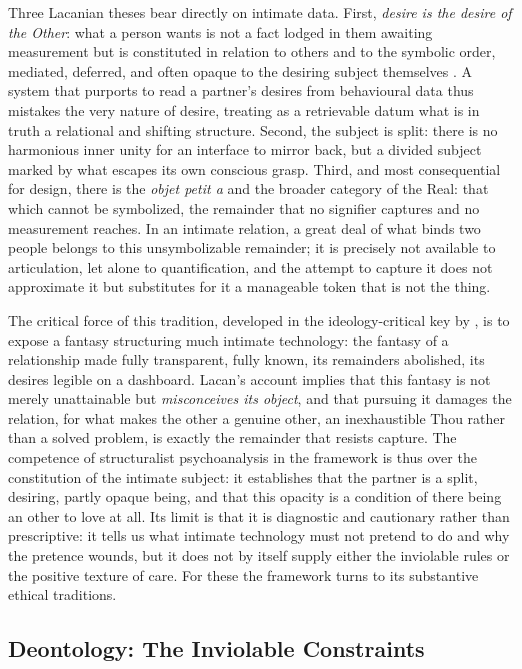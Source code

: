 Three Lacanian theses bear directly on intimate data. First, \emph{desire is the desire of the Other}: what a person wants is not a fact lodged in them awaiting measurement but is constituted in relation to others and to the symbolic order, mediated, deferred, and often opaque to the desiring subject themselves \parencite{lacan1977four}. A system that purports to read a partner's desires from behavioural data thus mistakes the very nature of desire, treating as a retrievable datum what is in truth a relational and shifting structure. Second, the subject is split: there is no harmonious inner unity for an interface to mirror back, but a divided subject marked by what escapes its own conscious grasp. Third, and most consequential for design, there is the \emph{objet petit a} and the broader category of the Real: that which cannot be symbolized, the remainder that no signifier captures and no measurement reaches. In an intimate relation, a great deal of what binds two people belongs to this unsymbolizable remainder; it is precisely not available to articulation, let alone to quantification, and the attempt to capture it does not approximate it but substitutes for it a manageable token that is not the thing.

The critical force of this tradition, developed in the ideology-critical key by \textcite{zizek1989sublime}, is to expose a fantasy structuring much intimate technology: the fantasy of a relationship made fully transparent, fully known, its remainders abolished, its desires legible on a dashboard. Lacan's account implies that this fantasy is not merely unattainable but \emph{misconceives its object}, and that pursuing it damages the relation, for what makes the other a genuine other, an inexhaustible Thou rather than a solved problem, is exactly the remainder that resists capture. The competence of structuralist psychoanalysis in the framework is thus over the constitution of the intimate subject: it establishes that the partner is a split, desiring, partly opaque being, and that this opacity is a condition of there being an other to love at all. Its limit is that it is diagnostic and cautionary rather than prescriptive: it tells us what intimate technology must not pretend to do and why the pretence wounds, but it does not by itself supply either the inviolable rules or the positive texture of care. For these the framework turns to its substantive ethical traditions.

\subsection{Deontology: The Inviolable Constraints}\label{p01:sec:deontology}

